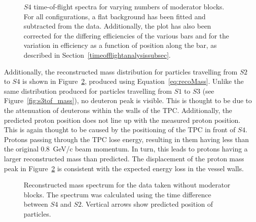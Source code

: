 \begin{figure}[ht]
  \begin{adjustbox}{max totalsize={\textwidth}{.5\textheight},center}
    
  \end{adjustbox}
  \caption{$\mathit{S4}$ time-of-flight spectra for varying numbers of moderator blocks. For all configurations, a flat background has been fitted and subtracted from the data. Additionally, the plot has also been corrected for the differing efficiencies of the various bars and for the variation in efficiency as a function of position along the bar, as described in Section~\ref{timeofflightanalysissubsec}.}
  \label{fig:s4tof}	
\end{figure}

Additionally, the reconstructed mass distribution for particles travelling from $\mathit{S2}$ to $\mathit{S4}$ is shown in Figure~\ref{fig:s4tof_mass}, produced using Equation~\ref{eq:recoMass}.
Unlike the same distribution produced for particles travelling from $\mathit{S1}$ to $\mathit{S3}$ (see Figure~\ref{fig:s3tof_mass}), no deuteron peak is visible.
This is thought to be due to the attenuation of deuterons within the walls of the TPC.
Additionally, the predicted proton position does not line up with the measured proton position. 
This is again thought to be caused by the positioning of the TPC in front of $\mathit{S4}$.
Protons passing through the TPC lose energy, resulting in them having less than the original 0.8~GeV/c beam momentum.
In turn, this leads to protons having a larger reconstructed mass than predicted.
The displacement of the proton mass peak in Figure~\ref{fig:s4tof_mass} is consistent with the expected energy loss in the vessel walls.

\begin{figure}[ht]
  \centering
  \begin{adjustbox}{max totalsize={.9\textwidth}{.5\textheight},center}
    
  \end{adjustbox}
  \caption{Reconstructed mass spectrum for the data taken without moderator blocks. The spectrum was calculated using the time difference between $\mathit{S4}$ and $\mathit{S2}$. Vertical arrows show predicted position of particles.}
  \label{fig:s4tof_mass}
\end{figure}

